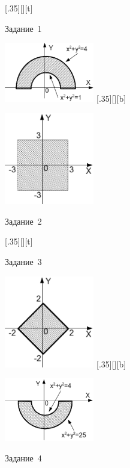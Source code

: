 \begin{figure}[H]
\begin{floatrow}
[.35\textwidth][\FBheight][t]
{\caption{Задание~1}
\label{ch03:refDrawing63}}
{\includegraphics[width=0.35\textwidth,keepaspectratio]{img/ris_3_64}}%
%
[.35\textwidth][\FBheight][b]
{\caption{Задание~2}
\label{ch03:refDrawing64}}
{\includegraphics[width=0.35\textwidth]{img/ris_3_65}}
\end{floatrow}
\end{figure}

\begin{figure}[H]
\begin{floatrow}
[.35\textwidth][\FBheight][t]
{\caption{Задание~3}
\label{ch03:refDrawing65}}
{\includegraphics[width=0.35\textwidth,keepaspectratio]{img/ris_3_66}}%
%
[.35\textwidth][\FBheight][b]
{\caption{Задание~4}
\label{ch03:refDrawing66}}
{\includegraphics[width=0.35\textwidth]{img/ris_3_67}}
\end{floatrow}
\end{figure}

